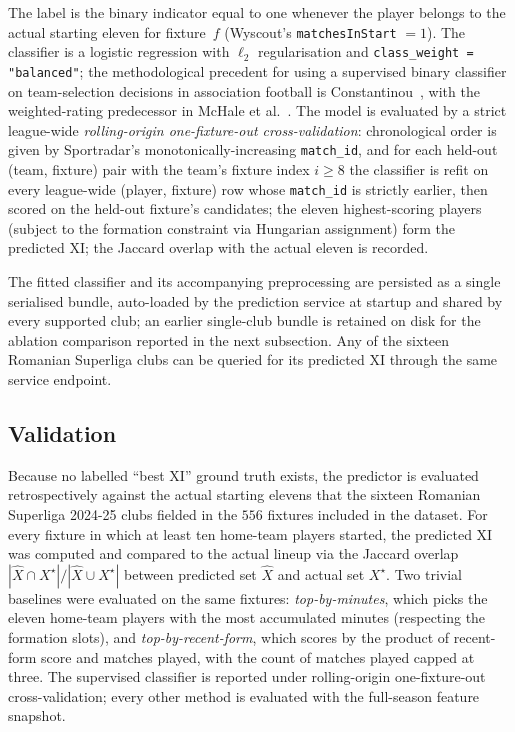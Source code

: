 The label is the binary indicator equal to one whenever the player belongs to the actual starting eleven for fixture~$f$ (Wyscout's \texttt{matchesInStart} $= 1$). The classifier is a logistic regression with $\ell_2$ regularisation and \texttt{class\_weight = "balanced"}; the methodological precedent for using a supervised binary classifier on team-selection decisions in association football is Constantinou~\cite{constantinou2019dolores}, with the weighted-rating predecessor in McHale et al.~\cite{mchale2012interfaces}. The model is evaluated by a strict league-wide \emph{rolling-origin one-fixture-out cross-validation}: chronological order is given by Sportradar's monotonically-increasing \texttt{match\_id}, and for each held-out (team, fixture) pair with the team's fixture index $i \geq 8$ the classifier is refit on every league-wide (player, fixture) row whose \texttt{match\_id} is strictly earlier, then scored on the held-out fixture's candidates; the eleven highest-scoring players (subject to the formation constraint via Hungarian assignment) form the predicted XI; the Jaccard overlap with the actual eleven is recorded.

The fitted classifier and its accompanying preprocessing are persisted as a single serialised bundle, auto-loaded by the prediction service at startup and shared by every supported club; an earlier single-club bundle is retained on disk for the ablation comparison reported in the next subsection. Any of the sixteen Romanian Superliga clubs can be queried for its predicted XI through the same service endpoint.

\subsection{Validation}
\label{subsec:xi_validation}

Because no labelled ``best XI'' ground truth exists, the predictor is evaluated retrospectively against the actual starting elevens that the sixteen Romanian Superliga 2024-25 clubs fielded in the $556$ fixtures included in the dataset. For every fixture in which at least ten home-team players started, the predicted XI was computed and compared to the actual lineup via the Jaccard overlap $|\hat{X} \cap X^\star| / |\hat{X} \cup X^\star|$ between predicted set $\hat{X}$ and actual set $X^\star$. Two trivial baselines were evaluated on the same fixtures: \emph{top-by-minutes}, which picks the eleven home-team players with the most accumulated minutes (respecting the formation slots), and \emph{top-by-recent-form}, which scores by the product of recent-form score and matches played, with the count of matches played capped at three. The supervised classifier is reported under rolling-origin one-fixture-out cross-validation; every other method is evaluated with the full-season feature snapshot.

